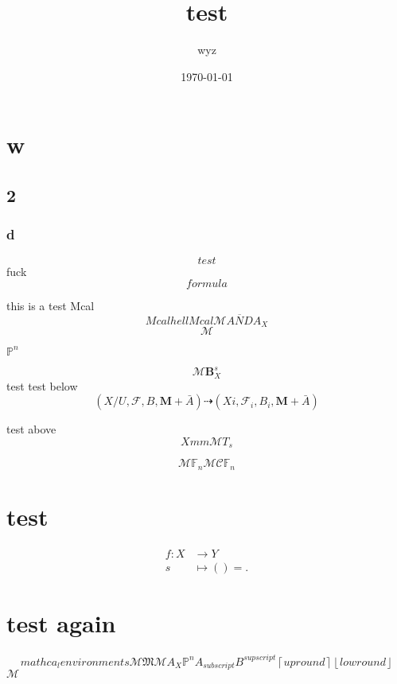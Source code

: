 \documentclass{article}
\title{test}
\author{wyz}
\date{\today}
\begin{document}
\maketitle
\section{w}
\subsection{2}

\subsubsection{d}
\begin{equation}
  test
\end{equation}
fuck
\[
  formula
\]

\newpage

this is a test
Mcal
\begin{equation}
  Mcal hell Mcal
  \mathcal{M}  \overline{AND} A_{X}
\end{equation}
\[
  \mathcal{M}
\]

$\mathbb{P}^{n}$

\[
  \mathcal{M} \mathbf{B}_{X}^{s}
\]
test
test below
\[
  (X/U,\mathcal{F},B,\mathbf{M}+ \bar{A})  \dashrightarrow (Xi,\mathcal{F}_{i},B_{i},\mathbf{M}+\bar{A})
\]

test above
\[
  Xmm  \mathcal{M} T_{s}
\]

\[
  \mathcal{M} \mathbb{F}_{n}
  \mathcal{M} \mathcal{C} \mathbb{F}_{n}
\]

\section{test}
\begin{center}
  \begin{align*}
    f : X & \longrightarrow Y \\
    s     & \longmapsto () =
    .
  \end{align*}
\end{center}

\section{test again}
\[
  mathca_{l} environments  \mathcal{M} \mathfrak{M} \mathscr{M} A_{X} \mathbb{P}^{n} A_{subscript} B^{supscript} \left\lceil up round \right\rceil \left\lfloor low round \right\rfloor
\] $\mathcal{M}$
\end{document}
